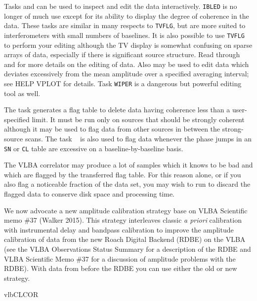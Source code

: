 Tasks {\tt {}} and {\tt {}} can be used to inspect
and edit the data interactively.  {\tt IBLED} is no longer of much use
except for its ability to display the degree of coherence in the data.
These tasks are similar in many respects to {\tt TVFLG}, but are more
suited to interferometers with small numbers of baselines. It is also
possible to use {\tt TVFLG} to perform your editing although the TV
display is somewhat confusing on sparse arrays of data, especially if
there is significant source structure.  Read  through
 and  for more details on the editing of data.
Also {\tt {}} may be used to edit data which deviates
excessively from the mean amplitude over a specified averaging
interval; see {\us HELP VPLOT \CR} for details.  Task {\tt WIPER} is a
dangerous but powerful editing tool as well.

The task {\tt {}} generates a flag table to delete data having
coherence less than a user-specified limit.  It must be run only on sources
that should be strongly coherent although it may be used to flag data from
other sources in between the strong-source scans.  The task {\tt
{}} is also used to flag data whenever the phase jumps in an
{\tt SN} or {\tt CL} table are excessive on a baseline-by-baseline
basis.

The VLBA correlator may produce a lot of samples which it knows to be
bad and which are flagged by the transferred flag table.  For this
reason alone, or if you also flag a noticeable fraction of the data
set, you may wish to run {\tt {}} to discard the flagged
data to conserve disk space and processing time.


We now advocate a new amplitude calibration strategy base on VLBA
Scientific memo \#37 (Walker 2015).  This strategy interleaves classic
{\it a priori} calibration with instrumental delay and bandpass
calibration to improve the amplitude calibration of data from the new
Roach Digital Backend (RDBE) on the VLBA (see the VLBA Observations
Status Summary for a description
of the RDBE and VLBA Scientific Memo \#37 for a discussion of amplitude
problems with the RDBE).  With data from before the RDBE you can use either
the old or new strategy.


 {vlbCLCOR}

